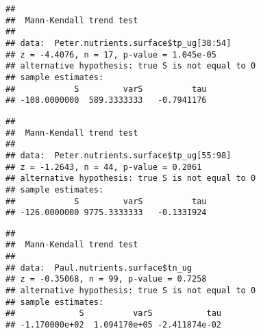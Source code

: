\documentclass[]{article}
\newenvironment{Shaded}{\begin{snugshade}}{\end{snugshade}}
\newcommand{\KeywordTok}[1]{\textcolor[rgb]{0.13,0.29,0.53}{\textbf{#1}}}
\newcommand{\DecValTok}[1]{\textcolor[rgb]{0.00,0.00,0.81}{#1}}
\newcommand{\CommentTok}[1]{\textcolor[rgb]{0.56,0.35,0.01}{\textit{#1}}}
\newcommand{\OperatorTok}[1]{\textcolor[rgb]{0.81,0.36,0.00}{\textbf{#1}}}
\newcommand{\NormalTok}[1]{#1}
\begin{document}
\begin{Shaded}
\end{Shaded}

\begin{verbatim}
## 
##  Mann-Kendall trend test
## 
## data:  Peter.nutrients.surface$tp_ug[38:54]
## z = -4.4076, n = 17, p-value = 1.045e-05
## alternative hypothesis: true S is not equal to 0
## sample estimates:
##            S         varS          tau 
## -108.0000000  589.3333333   -0.7941176
\end{verbatim}

\begin{Shaded}
\end{Shaded}

\begin{verbatim}
## 
##  Mann-Kendall trend test
## 
## data:  Peter.nutrients.surface$tp_ug[55:98]
## z = -1.2643, n = 44, p-value = 0.2061
## alternative hypothesis: true S is not equal to 0
## sample estimates:
##            S         varS          tau 
## -126.0000000 9775.3333333   -0.1331924
\end{verbatim}

\begin{Shaded}
\end{Shaded}

\begin{verbatim}
## 
##  Mann-Kendall trend test
## 
## data:  Paul.nutrients.surface$tn_ug
## z = -0.35068, n = 99, p-value = 0.7258
## alternative hypothesis: true S is not equal to 0
## sample estimates:
##             S          varS           tau 
## -1.170000e+02  1.094170e+05 -2.411874e-02
\end{verbatim}

\begin{Shaded}
\end{Shaded}
\end{document}
